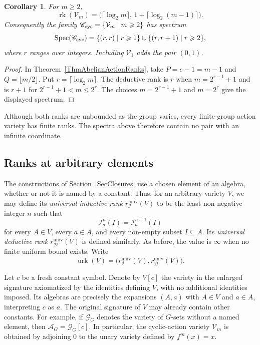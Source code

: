 \documentclass[12pt,english]{amsart}
\newtheorem{corollary}[theorem]{Corollary}
\theoremstyle{definition}
\numberwithin{equation}{section}
\theoremstyle{remark}
\begin{document}
\begin{corollary}\label{ThmSpecialCyclicSpectrum}
For $m\geqslant2$,
\[
\operatorname{rk}(\mathcal V_m)
=\bigl(\lceil\log_2m\rceil,\,
       1+\lceil\log_2(m-1)\rceil\bigr).
\]
Consequently the family $\mathscr C_{\rm cyc}
=\{\mathcal V_m\mid m\geqslant2\}$ has spectrum
\[
\operatorname{Spec}(\mathscr C_{\rm cyc})
=\{(r,r)\mid r\geqslant1\}
 \cup\{(r,r+1)\mid r\geqslant2\},
\]
where $r$ ranges over integers. Including $\mathcal V_1$ adds
the pair $(0,1)$.
\end{corollary}

\begin{proof}
In Theorem~\ref{ThmAbelianActionRanks}, take
$P=e-1=m-1$ and $Q=\lfloor m/2\rfloor$. Put
$r=\lceil\log_2m\rceil$. The deductive rank is $r$ when
$m=2^{r-1}+1$ and is $r+1$ for
$2^{r-1}+1<m\leqslant2^r$. The choices
$m=2^{r-1}+1$ and $m=2^r$ give the displayed spectrum.
\end{proof}

Although both ranks are unbounded as the group varies, every
finite-group action variety has finite ranks. The spectra above
therefore contain no pair with an infinite coordinate.

\subsection{Ranks at arbitrary elements}\label{SubsecUniversalRanks}

The constructions of Section~\ref{SecClosures} use a chosen element
of an algebra, whether or not it is named by a constant. Thus, for an
arbitrary variety $V$, we may define its \emph{universal inductive rank}
$r_{\mathcal I}^{\mathrm{univ}}(V)$ to be the least non-negative integer $n$
such that
\[
\mathcal I_a^n(I)=\mathcal I_a^{n+1}(I)
\]
for every $A\in V$, every $a\in A$, and every non-empty subset
$I\subseteq A$. Its \emph{universal deductive rank}
$r_{\mathcal D}^{\mathrm{univ}}(V)$ is defined similarly. As before, the
value is $\infty$ when no finite uniform bound exists. Write
\[
\operatorname{urk}(V)
=\bigl(r_{\mathcal I}^{\mathrm{univ}}(V),
       r_{\mathcal D}^{\mathrm{univ}}(V)\bigr).
\]

Let $c$ be a fresh constant symbol. Denote by $V[c]$ the variety in the
enlarged signature axiomatized by the identities defining $V$, with
no additional identities imposed. Its algebras are precisely the
expansions $(A,a)$ with $A\in V$ and $a\in A$, interpreting $c$ as $a$.
The original signature of $V$ may already contain other constants.
For example, if $\mathcal G_G$ denotes the variety of $G$-sets
without a named element, then
$\mathcal A_G=\mathcal G_G[c]$. In particular, the cyclic-action
variety $\mathcal V_m$ is obtained by adjoining $0$ to the unary
variety defined by $f^m(x)=x$.
\end{document}
